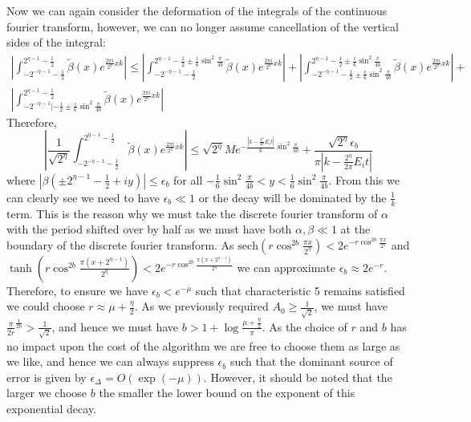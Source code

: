 \documentclass[aps,floatfix,10pt,amssymb,amsfont,amsmath,superscriptaddress,float,nofootinbib,longbibliography,nobalancelastpage,twocolumn]{revtex4-2}
\begin{document}
Now we can again consider the deformation of the integrals of the continuous fourier transform, however, we can no longer assume cancellation of the vertical sides of the integral:
\begin{multline}
     \left|\int_{-2^{-\eta-1}-\frac{1}{2}}^{2^{\eta-1}-\frac{1}{2}}\tilde\beta(x)e^{\frac{2\pi i}{2^{\eta}}xk}\right| \leq \left|\int_{-2^{-\eta-1}-\frac{1}{2}}^{2^{\eta-1}-\frac{1}{2}\pm\frac{i}{6}\sin^2 \frac{\pi}{4b}}\tilde\beta(x)e^{\frac{2\pi i}{2^{\eta}}xk}\right|+\left|\int_{-2^{-\eta-1}-\frac{1}{2}\pm\frac{i}{6}\sin^2 \frac{\pi}{4b}}^{2^{\eta-1}-\frac{1}{2}\pm\frac{i}{6}\sin^2 \frac{\pi}{4b}}\tilde\beta(x)e^{\frac{2\pi i}{2^{\eta}}xk}\right|+\\\left|\int_{-2^{-\eta-1}|-\frac{1}{2}\pm\frac{i}{6}\sin^2 \frac{\pi}{4b}}^{2^{\eta-1}-\frac{1}{2}}\tilde\beta(x)e^{\frac{2\pi i}{2^{\eta}}xk}\right|
\end{multline}
Therefore,
\begin{equation}
    \left|\frac{1}{\sqrt{2^{\eta}}}\int_{-2^{-\eta-1}-\frac{1}{2}}^{2^{\eta-1}-\frac{1}{2}}\tilde\beta(x)e^{\frac{2\pi i}{2^{\eta}}xk}\right| \leq \sqrt{2^{\eta}}Me^{-\frac{|k-\frac{2^{\eta}}{2\pi}E_i t|}{6}\sin^2 \frac{\pi}{4b}} + \frac{\sqrt{2^{\eta}}\epsilon_b}{\pi|k-\frac{2^{\eta}}{2\pi}E_i t|}
\end{equation}
where $|\beta(\pm2^{\eta-1}-\frac{1}{2}+iy)| \leq\epsilon_b$ for all $-\frac{1}{6}\sin^2\frac{\pi}{4b}<y<\frac{1}{6}\sin^2\frac{\pi}{4b}$. From this we can clearly see we need to have $\epsilon_b \ll 1$ or the decay will be dominated by the $\frac{1}{k}$ term. This is the reason why we must take the discrete fourier transform of $\alpha$ with the period shifted over by half as we must have both $\alpha, \beta \ll 1$ at the boundary of the discrete fourier transform. As $\text{sech}( r\cos^{2b} \frac{\pi x}{2^{\eta}})< 2e^{-r\cos^{2b} \frac{\pi x}{2^{\eta}}}$ and $\tanh (r\cos^{2b} \frac{\pi (x+2^{\eta-1})}{2^{\eta}}) < 2e^{-r\cos^{2b} \frac{\pi (x+2^{\eta-1})}{2^{\eta}}}$ we can approximate $\epsilon_b \approx 2e^{-r}$. Therefore, to ensure we have $\epsilon_b < e^{-\mu}$ such that characteristic 5 remains satisfied we could choose $r\approx \mu+\frac{\eta}{2}$. As we previously required $A_0 \geq \frac{1}{\sqrt{2}}$, we must have $\frac{\pi}{2r}^{\frac{1}{2b}} > \frac{1}{\sqrt{2}}$, and hence we must have $b > 1 + \log \frac{\mu + \frac{\eta}{2}}{\pi}$. As the choice of $r$ and $b$ has no impact upon the cost of the algorithm we are free to choose them as large as we like, and hence we can always suppress $\epsilon_b$ such that the dominant source of error is given by $\epsilon_{\Delta} = O(\exp(-\mu))$. However, it should be noted that the larger we choose $b$ the smaller the lower bound on the exponent of this exponential decay.
\end{document}
